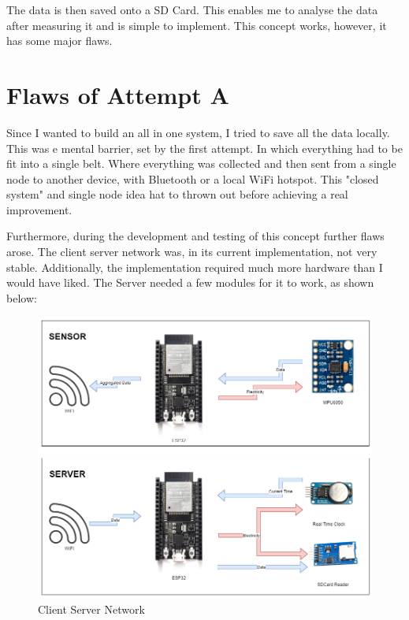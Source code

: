 The data is then saved onto a SD Card. This enables me to analyse the data after measuring it and is simple to implement. This concept works, however, it has some major flaws. 

\section{Flaws of Attempt A}

Since I wanted to build an all in one system, I tried to save all the data locally. This was e mental barrier, set by the first attempt. In which everything had to be fit into a single belt. Where everything was collected and then sent from a single node to another device, with Bluetooth or a local WiFi hotspot. This "closed system" and single node idea hat to thrown out before achieving a real improvement.

Furthermore, during the development and testing of this concept further flaws arose. The client server network was, in its current implementation, not very stable. Additionally, the implementation required much more hardware than I would have liked. 
The Server needed a few modules for it to work, as shown below:


\begin{figure}[ht]
  \begin{center}
\includegraphics[width=\linewidth]{images/CommunicationDiagrammExplenation.png}
  \end{center}
  \caption{Client Server Network}
  \label{fig:ClientServer}
\end{figure}

